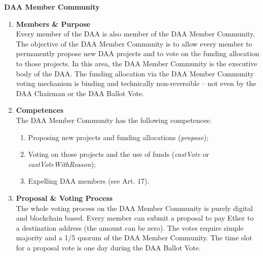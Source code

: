 \item \textbf{DAA Member Community} \\
\begin{enumerate}[label=\textbf{\arabic*.}]
    \item \textbf{Members \& Purpose} \\
    Every member of the DAA is also member of the DAA Member Community.
    The objective of the DAA Member Community is to allow every member to permanently propose new DAA projects and to vote on the funding allocation to those projects. %
    In this area, the DAA Member Community is the executive body of the DAA.
    The funding allocation via the DAA Member Community voting mechanism is binding and technically non-reversible – not even by the DAA Chairman or the DAA Ballot Vote.

    \item \textbf{Competences} \\
    The DAA Member Community has the following competences:
    \begin{enumerate}
        [label=(\alph*)]
        \item Proposing new projects and funding allocations (\emph{propose});
        \item Voting on those projects and the use of funds (\emph{castVote} or \emph{castVoteWithReason});
        \item Expelling DAA members (see Art. 17).
    \end{enumerate}

    \item \textbf{Proposal \& Voting Process} \\
    The whole voting process on the DAA Member Community is purely digital and blockchain based.
    Every member can submit a proposal to pay Ether to a destination address (the amount can be zero).
    The votes require simple majority and a 1/5 quorum of the DAA Member Community.
    The time slot for a proposal vote is one day during the DAA Ballot Vote.
\end{enumerate}
